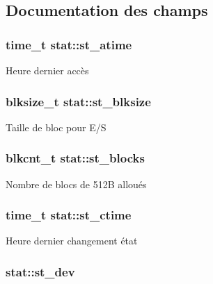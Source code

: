 \subsection{Documentation des champs}
\hypertarget{structstat_ab74d1e7e345e88b9d0fb2688a97cba64}{
\subsubsection[{st\-\_\-atime}]{\setlength{\rightskip}{0pt plus 5cm}time\-\_\-t stat\-::st\-\_\-atime}}\label{structstat_ab74d1e7e345e88b9d0fb2688a97cba64}
Heure dernier accès \hypertarget{structstat_a38d474e1ae3cf6fbdde89ac3c3e308f1}{
\subsubsection[{st\-\_\-blksize}]{\setlength{\rightskip}{0pt plus 5cm}blksize\-\_\-t stat\-::st\-\_\-blksize}}\label{structstat_a38d474e1ae3cf6fbdde89ac3c3e308f1}
Taille de bloc pour E/\-S \hypertarget{structstat_a42dd716b2f9234f961d949fc9500eefb}{
\subsubsection[{st\-\_\-blocks}]{\setlength{\rightskip}{0pt plus 5cm}blkcnt\-\_\-t stat\-::st\-\_\-blocks}}\label{structstat_a42dd716b2f9234f961d949fc9500eefb}
Nombre de blocs de 512\-B alloués \hypertarget{structstat_a1b4b858db1ebe79c3d6e0fc1ef721024}{
\subsubsection[{st\-\_\-ctime}]{\setlength{\rightskip}{0pt plus 5cm}time\-\_\-t stat\-::st\-\_\-ctime}}\label{structstat_a1b4b858db1ebe79c3d6e0fc1ef721024}
Heure dernier changement état \hypertarget{structstat_ac5b90090ae323741ae4c9e4f3683a29f}{
\subsubsection[{st\-\_\-dev}]{ stat\-::st\-\_\-dev}}\label{structstat_ac5b90090ae323741ae4c9e4f3683a29f}
